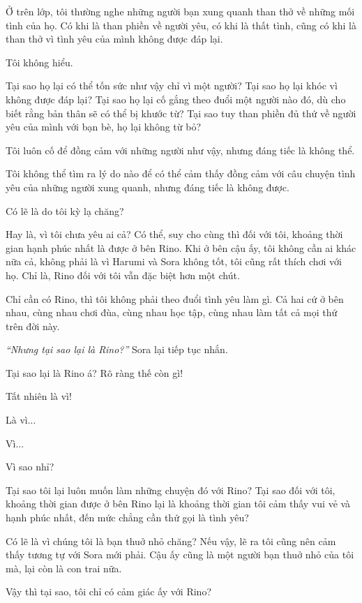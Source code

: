 {    Ở trên lớp, tôi thường nghe những người bạn xung quanh than thở về những
    mối tình của họ. Có khi là than phiền về người yêu, có khi là thất tình,
    cũng có khi là than thở vì tình yêu của mình không được đáp lại.

    Tôi không hiểu.

    Tại sao họ lại có thể tốn sức như vậy chỉ vì một người? Tại sao họ lại
    khóc vì không được đáp lại? Tại sao họ lại cố gắng theo đuổi một người
    nào đó, dù cho biết rằng bản thân sẽ có thể bị khước từ? Tại sao tuy
    than phiền đủ thứ về người yêu của mình với bạn bè, họ lại không từ bỏ?

    Tôi luôn cố để đồng cảm với những người như vậy, nhưng đáng tiếc là
    không thể.

    Tôi không thể tìm ra lý do nào để có thể cảm thấy đồng cảm với câu
    chuyện tình yêu của những người xung quanh, nhưng đáng tiếc là không
    được.

    Có lẽ là do tôi kỳ lạ chăng?

    Hay là, vì tôi chưa yêu ai cả? Có thể, suy cho cùng thì đối với tôi,
    khoảng thời gian hạnh phúc nhất là được ở bên Rino. Khi ở bên cậu ấy,
    tôi không cần ai khác nữa cả, không phải là vì Harumi và Sora không tốt,
    tôi cũng rất thích chơi với họ. Chỉ là, Rino đối với tôi vẫn đặc biệt
    hơn một chút.

    Chỉ cần có Rino, thì tôi không phải theo đuổi tình yêu làm gì. Cả hai cứ
    ở bên nhau, cùng nhau chơi đùa, cùng nhau học tập, cùng nhau làm tất cả
    mọi thứ trên đời này.

    \emph{``Nhưng tại sao lại là Rino?''} Sora lại tiếp tục nhắn.

    Tại sao lại là Rino á? Rõ ràng thế còn gì!

    Tất nhiên là vì!

    Là vì...

    Vì...

    Vì sao nhỉ?

    Tại sao tôi lại luôn muốn làm những chuyện đó với Rino? Tại sao đối với
    tôi, khoảng thời gian được ở bên Rino lại là khoảng thời gian tôi cảm
    thấy vui vẻ và hạnh phúc nhất, đến mức chẳng cần thứ gọi là tình yêu?

    Có lẽ là vì chúng tôi là bạn thuở nhỏ chăng? Nếu vậy, lẽ ra tôi cũng nên
    cảm thấy tương tự với Sora mới phải. Cậu ấy cũng là một người bạn thuở
    nhỏ của tôi mà, lại còn là con trai nữa.

    Vậy thì tại sao, tôi chỉ có cảm giác ấy với Rino?

}
